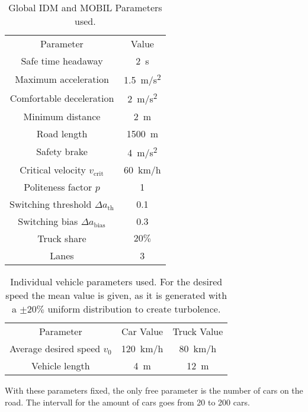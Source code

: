 \begin{table}[b]%
  \caption{\label{tab:global_parameters}%
    Global IDM and MOBIL Parameters used.
  }
  \begin{ruledtabular}
    \begin{tabular}{c c}
      Parameter 
  & Value \\
  \colrule
      Safe time headaway          & \SI{2}{s}         \\
      Maximum acceleration        & \SI{1.5}{m/s^2}       \\
      Comfortable deceleration    & \SI{2}{m/s^2} \\
      Minimum distance            & \SI{2}{m} \\
      Road length                 & \SI{1500}{m} \\
      Safety brake                & \SI{4}{m/s^2} \\
      Critical velocity $v_\text{crit}$ & \SI{60}{km/h} \\
      Politeness factor $p$       & 1 \\
      Switching threshold $\Delta a_\text{th}$ & 0.1 \\
      Switching bias  $\Delta a_\text{bias}$ & 0.3 \\
      Truck share & $20\%$ \\
      Lanes & 3 \\
    \end{tabular}
  \end{ruledtabular}
\end{table}

\begin{table}[b]%
  \caption{\label{tab:individual_parameters}%
    Individual vehicle parameters used. For the desired speed the mean value is given, as it is generated with
    a $\pm 20\%$ uniform distribution to create turbolence.
  }
  \begin{ruledtabular}
    \begin{tabular}{c c c}
      Parameter 
  & Car Value 
  & Truck Value\\
  \colrule
      Average desired speed $v_0$ & \SI{120}{km/h} & \SI{80}{km/h} \\
      Vehicle length & \SI{4}{m} & \SI{12}{m} \\
    \end{tabular}
  \end{ruledtabular}
\end{table}

With these parameters fixed, the only free parameter is the number of cars on the road. The
intervall for the amount of cars goes from 20 to 200 cars.
